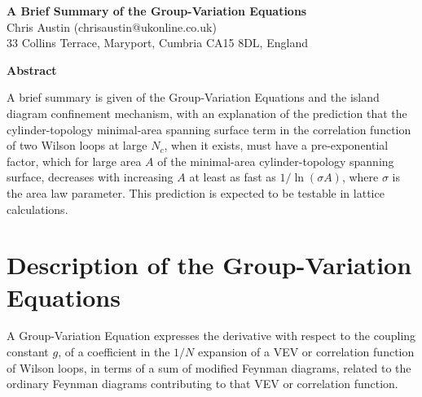 \documentclass[a4paper,12pt,oneside]{article}
\begin{document}


\begin{center}
{\large\bf A Brief Summary of the Group-Variation Equations\\}
{Chris Austin (chrisaustin@ukonline.co.uk)\\
33 Collins Terrace, Maryport, Cumbria CA15 8DL, England\\
}
\end{center}
\begin{center}
{\bf Abstract}
\end{center}
\noindent A brief summary is given of the Group-Variation Equations and 
the island diagram confinement mechanism, with an explanation of 
the prediction that the cylinder-topology minimal-area spanning surface 
term in the correlation function of two Wilson loops at large $N_c$, 
when it exists, must have a pre-exponential factor, which for large area 
$A$ of the minimal-area cylinder-topology spanning surface, decreases 
with increasing $A$ at least as fast as $1/\ln(\sigma A)$, where 
$\sigma$ is the area law parameter.  This prediction is expected to be 
testable in lattice calculations.

\section{Description of the Group-Variation Equations}

A Group-Variation Equation \cite{GVE} expresses the derivative with respect to the
coupling constant $g$, of a coefficient in the $1/N$ expansion \cite{Planar} of a VEV or
correlation function of Wilson loops, in terms of a sum of modified Feynman
diagrams, related to the ordinary Feynman diagrams contributing to that VEV
or correlation function.
\end{document}
